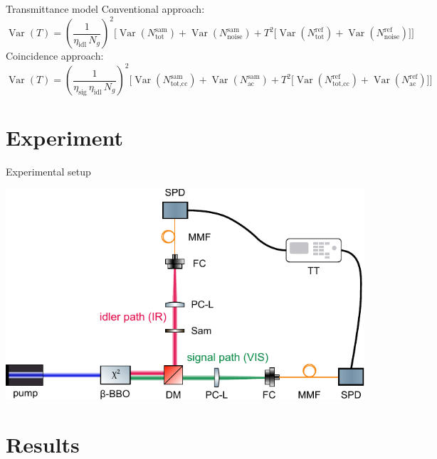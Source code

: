 \documentclass[10pt,aspectratio=43]{beamer}
\begin{document}
	\begin{frame}{Transmittance model}
			Conventional approach:
			\begin{equation}
				\operatorname{Var}(T) 
				= \left( \frac{1}{\eta_{\text{idl}}\,N_g} \right)^{2}
				\Bigg[
				\operatorname{Var}\!\left(N_{\text{tot}}^{\text{sam}}\right) 
				+ \operatorname{Var}\!\left(N_{\text{noise}}^{\text{sam}}\right) 
				+ T^{2} \Big[ 
				\operatorname{Var}\!\left(N_{\text{tot}}^{\text{ref}}\right) 
				+ \operatorname{Var}\!\left(N_{\text{noise}}^{\text{ref}}\right) 
				\Big]
				\Bigg]
				\label{eq:VarianceTransExpl}
				\nonumber
			\end{equation}
			\vspace{2em}
			Coincidence approach:
			\begin{equation}
				\operatorname{Var}(T) 
				= \left( \frac{1}{\eta_{\text{sig}}\,\eta_{\text{idl}}\,N_g} \right)^{2}
				\Bigg[
				\operatorname{Var}\!\left(N_{\text{tot,cc}}^{\text{sam}}\right) 
				+ \operatorname{Var}\!\left(N_{\text{ac}}^{\text{sam}}\right) 
				+ T^{2} \Big[ 
				\operatorname{Var}\!\left(N_{\text{tot,cc}}^{\text{ref}}\right) 
				+ \operatorname{Var}\!\left(N_{\text{ac}}^{\text{ref}}\right) 
				\Big]
				\Bigg]
				\label{eq:VarianceTransExplCoinc}
				\nonumber
			\end{equation}
	\end{frame}
	
	
	\section{Experiment}
	\begin{frame}{Experimental setup}
			\begin{center}
				\includegraphics[width=.7\textwidth]{Images/DupishSetup.pdf}
			\end{center}
			
	\end{frame}
	\section{Results}
	
\end{document}
